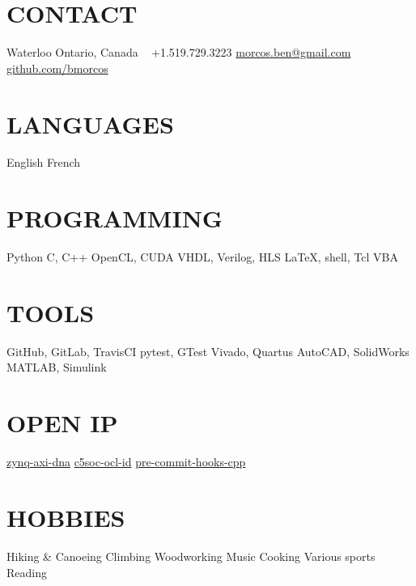 \documentclass[a4paper,nocolors]{cv-friggeri-ben}
\begin{document}


\begin{aside} %
    \section{CONTACT}
    \hfill Waterloo
    \hfill Ontario, Canada
    ~
    \hfill +1.519.729.3223
    \hfill \href{mailto:morcos.ben@gmail.com}{morcos.ben@gmail.com}
    ~
    \hfill \href{https://github.com/bmorcos}{github.com/bmorcos}
    \section{LANGUAGES}
    English
    French
    \section{PROGRAMMING}
    Python
    C, C++
    OpenCL, CUDA
    VHDL, Verilog, HLS
    \LaTeX, shell, Tcl
    VBA
    \section{TOOLS}
    GitHub, GitLab, TravisCI
    pytest, GTest
    Vivado, Quartus
    AutoCAD, SolidWorks
    MATLAB, Simulink
    \section{OPEN IP}
    \href{https://github.com/abr/zynq-axi-dna}{zynq-axi-dna}
    \href{https://github.com/abr/c5soc-ocl-id}{c5soc-ocl-id}
    \href{https://github.com/bmorcos/pre-commit-hooks-cpp}{pre-commit-hooks-cpp}
    \section{HOBBIES}
    Hiking \& Canoeing
    Climbing
    Woodworking
    Music
    Cooking
    Various sports
    Reading
\end{aside}


\end{document}
